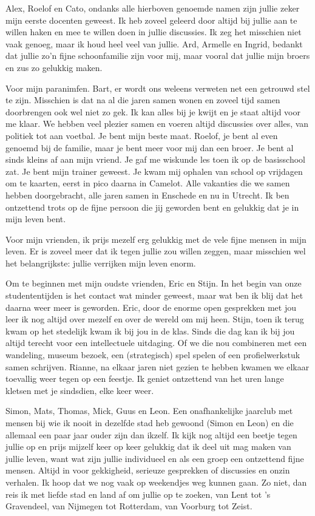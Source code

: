 \documentclass[openright,titlepage,12pt,a4paper]{book}
\begin{document}
Alex, Roelof en Cato, ondanks alle hierboven genoemde namen zijn jullie zeker mijn eerste docenten geweest. Ik heb zoveel geleerd door altijd bij jullie aan te willen haken en mee te willen doen in jullie discussies. Ik zeg het misschien niet vaak genoeg, maar ik houd heel veel van jullie. Ard, Armelle en Ingrid, bedankt dat jullie zo'n fijne schoonfamilie zijn voor mij, maar vooral dat jullie mijn broers en zus zo gelukkig maken.

Voor mijn paranimfen. Bart, er wordt ons weleens verweten net een getrouwd stel te zijn. Misschien is dat na al die jaren samen wonen en zoveel tijd samen doorbrengen ook wel niet zo gek. Ik kan alles bij je kwijt en je staat altijd voor me klaar. We hebben veel plezier samen en voeren altijd discussies over alles, van politiek tot aan voetbal. Je bent mijn beste maat. Roelof, je bent al even genoemd bij de familie, maar je bent meer voor mij dan een broer. Je bent al sinds kleins af aan mijn vriend. Je gaf me wiskunde les toen ik op de basisschool zat. Je bent mijn trainer geweest. Je kwam mij ophalen van school op vrijdagen om te kaarten, eerst in pico daarna in Camelot. Alle vakanties die we samen hebben doorgebracht, alle jaren samen in Enschede en nu in Utrecht. Ik ben ontzettend trots op de fijne persoon die jij geworden bent en gelukkig dat je in mijn leven bent.

Voor mijn vrienden, ik prijs mezelf erg gelukkig met de vele fijne mensen in mijn leven. Er is zoveel meer dat ik tegen jullie zou willen zeggen, maar misschien wel het belangrijkste: jullie verrijken mijn leven enorm.

Om te beginnen met mijn oudste vrienden, Eric en Stijn. In het begin van onze studententijden is het contact wat minder geweest, maar wat ben ik blij dat het daarna weer meer is geworden. Eric, door de enorme open gesprekken met jou leer ik nog altijd over mezelf en over de wereld om mij heen. Stijn, toen ik terug kwam op het stedelijk kwam ik bij jou in de klas. Sinds die dag kan ik bij jou altijd terecht voor een intellectuele uitdaging. Of we die nou combineren met een wandeling, museum bezoek, een (strategisch) spel spelen of een profielwerkstuk samen schrijven. Rianne, na elkaar jaren niet gezien te hebben kwamen we elkaar toevallig weer tegen op een feestje. Ik geniet ontzettend van het uren lange kletsen met je sindsdien, elke keer weer.

Simon, Mats, Thomas, Mick, Guus en Leon. Een onafhankelijke jaarclub met mensen bij wie ik nooit in dezelfde stad heb gewoond (Simon en Leon) en die allemaal een paar jaar ouder zijn dan ikzelf. Ik kijk nog altijd een beetje tegen jullie op en prijs mijzelf keer op keer gelukkig dat ik deel uit mag maken van jullie leven, want wat zijn jullie individueel en als een groep een ontzettend fijne mensen. Altijd in voor gekkigheid, serieuze gesprekken of discussies en onzin verhalen. Ik hoop dat we nog vaak op weekendjes weg kunnen gaan. Zo niet, dan reis ik met liefde stad en land af om jullie op te zoeken, van Lent tot 's Gravendeel, van Nijmegen tot Rotterdam, van Voorburg tot Zeist.
\end{document}
